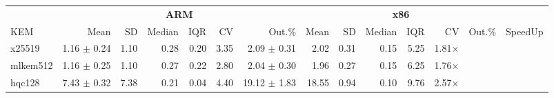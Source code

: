 \begin{table}[!ht]
\centering
\begin{tabular}{l|rrrrrr|rrrrrr|r}
\toprule
& \multicolumn{6}{c}{\bfseries ARM} & \multicolumn{6}{c}{\bfseries x86} & \\
\cmidrule(lr){2-7} \cmidrule(lr){8-13}
	KEM  & Mean & SD & Median & IQR & CV & Out.\% & Mean & SD & Median & IQR & CV & Out.\% & SpeedUp \\
\midrule
x25519   & 1.16 $\pm$ 0.24 & 1.10 & 0.28 & 0.20 & 3.35 	& 2.09  $\pm$ 0.31 & 2.02 & 0.31 & 0.15 & 5.25 & 1.81× \\
mlkem512 & 1.16 $\pm$ 0.25 & 1.10 & 0.27 & 0.22 & 2.80 	& 2.04  $\pm$ 0.30 & 1.96 & 0.27 & 0.15 & 6.25 & 1.76× \\
hqc128   & 7.43 $\pm$ 0.32 & 7.38 & 0.21 & 0.04 & 4.40 	& 19.12 $\pm$ 1.83 & 18.55 & 0.94 & 0.10 & 9.76 & 2.57× \\
\bottomrule
\end{tabular}
\end{table}

